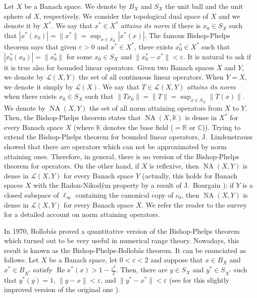 \documentclass[10pt,a4paper]{amsart}
\theoremstyle{plain}
\theoremstyle{definition}
\newcommand{\R}{\mathbb{R}}
\newcommand{\C}{\mathbb{C}}
\newcommand{\K}{\mathbb{K}}
\newcommand{\eps}{\varepsilon}
\DeclareMathOperator{\re}{Re}
\DeclareMathOperator{\NA}{NA}
\begin{document}
Let $X$ be a Banach space. We denote by $B_X$ and $S_X$ the unit ball and the unit sphere of $X$, respectively. We consider the topological dual space of $X$ and we denote it by $X^*$. We say that $x^* \in X^*$ {\it attains its norm} if there is $x_0 \in S_X$ such that $|x^*(x_0)| = \|x^*\| = \sup_{x \in S_X} |x^*(x)|$. The famous Bishop-Phelps theorem \cite{BP} says that given $\eps > 0$ and $x^* \in X^*$, there exists $x_0^* \in X^*$ such that $|x_0^*(x_0)| = \| x_0^* \|$ for some $x_0 \in S_X$ and $\|x_0^* - x^*\| < \eps$. It is natural to ask if it is true also for bounded linear operators. Given two Banach spaces $X$ and $Y$, we denote by $\mathcal{L}(X, Y)$ the set of all continuous linear operators. When $Y = X$, we denote it simply by $\mathcal{L}(X)$. We say that $T \in \mathcal{L}(X, Y)$ {\it attains its norm} when there exists $x_0 \in S_X$ such that $\|Tx_0\| = \|T\| = \sup_{x \in S_X} \|T(x)\|$. We denote by $\NA(X, Y)$ the set of all norm attaining operators from $X$ to $Y$. Then, the Bishop-Phelps theorem states that $\NA(X,\K)$ is dense in $X^*$ for every Banach space $X$ (where $\K$ denotes the base field ($=\R$ or $\C$)). Trying to extend the Bishop-Phelps theorem for bounded linear operators, J.~Lindenstrauss \cite{L} showed that there are operators which can not be approximated by norm attaining ones. Therefore, in general, there is no version of the Bishop-Phelps theorem for operators. On the other hand, if $X$ is reflexive, then $\NA(X,Y)$ is dense in $\mathcal{L}(X,Y)$ for every Banach space $Y$ (actually, this holds for Banach spaces $X$ with the Radon-Nikod\'{y}m property by a result of J.~Bourgain \cite{Bour}); if $Y$ is a closed subspace of $\ell_\infty$ containing the canonical copy of $c_0$, then $\NA(X,Y)$ is dense in $\mathcal{L}(X,Y)$ for every Banach space $X$. We refer the reader to the survey \cite{Acosta-RACSAM} for a detailed account on norm attaining operators.

In 1970, Bollob\'as \cite{Bol} proved a quantitative version of the Bishop-Phelps theorem which turned out to be very useful in numerical range theory. Nowadays, this result is known as the Bishop-Phelps-Bollob\'as theorem. It can be enunciated as follows. Let $X$ be a Banach space, let $0<\eps <2$ and suppose that $x \in B_X$ and $x^* \in B_{X^*}$ satisfy $\re x^*(x) > 1 - \frac{\eps^2}{2}$. Then, there are $y \in S_X$ and $y^* \in S_{X^*}$ such that $y^*(y) = 1$, $\|y - x\| < \eps$, and $\|y^* - x^*\| < \eps$  (see \cite{CKMM} for this slightly improved version of the original one \cite{Bol}).
\end{document}
